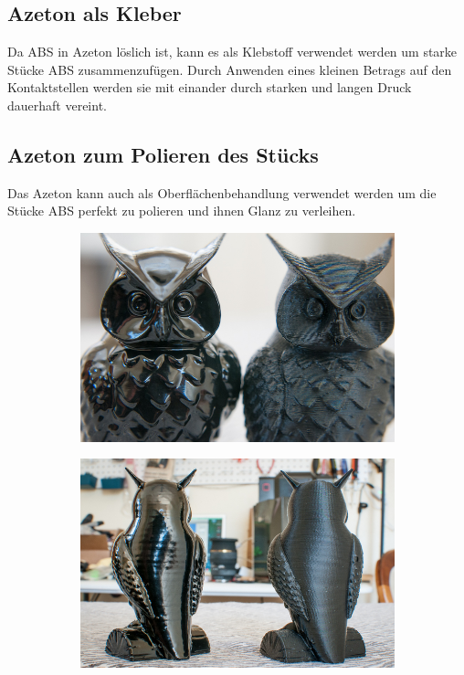 \documentclass[11pt,a4paper]{article}
\begin{document}
	\subsection{Azeton als Kleber}Da ABS in Azeton löslich ist, kann es als Klebstoff verwendet werden um starke Stücke ABS zusammenzufügen. Durch Anwenden eines kleinen Betrags auf den Kontaktstellen werden sie mit einander durch starken und langen Druck dauerhaft vereint.
	\subsection{Azeton zum Polieren des Stücks}Das Azeton kann auch als Oberflächenbehandlung verwendet werden um die Stücke ABS perfekt zu polieren und ihnen Glanz zu verleihen.
\begin{figure}[H]
    \centering
    \begin{subfigure}[b]{0.4\textwidth}
        \includegraphics[width=\textwidth,cfbox=azul_marcos 4pt 0pt]{FOTOS/VAPORACETONA1}
    \end{subfigure}
    \qquad %
    \begin{subfigure}[b]{0.4\textwidth}
        \includegraphics[width=\textwidth,cfbox=azul_marcos 4pt 0pt]{FOTOS/VAPORACETONA2}
    \end{subfigure}   
\end{figure}
\end{document}
